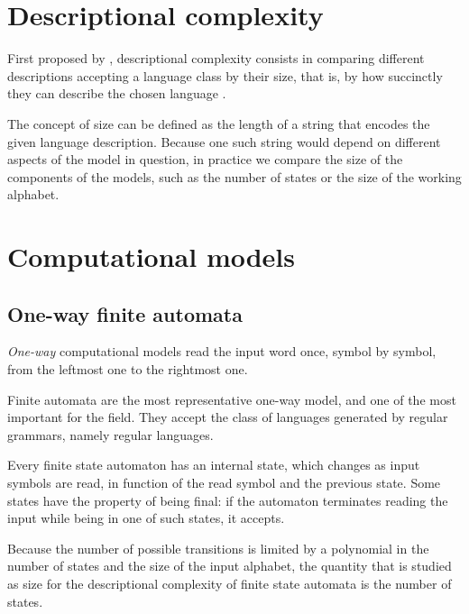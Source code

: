 \section{Descriptional complexity}
First proposed by \citeauthor{MeyFis71}, descriptional complexity consists in comparing different descriptions accepting a language class by their size, that is, by how succinctly they can describe the chosen language \cite{MeyFis71}.

The concept of size can be defined as the length of a string that encodes the given language description.
Because one such string would depend on different aspects of the model in question, in practice we compare the size of the components of the models, such as the number of states or the size of the working alphabet.



\section{Computational models}


\subsection{One-way finite automata}
\emph{One-way} computational models read the input word once, symbol by symbol, from the leftmost one to the rightmost one.

Finite automata are the most representative one-way model, and one of the most important for the field.
They accept the class of languages generated by regular grammars, namely regular languages.

Every finite state automaton has an internal state, which changes as input symbols are read, in function of the read symbol and the previous state.
Some states have the property of being final: if the automaton terminates reading the input while being in one of such states, it accepts.

Because the number of possible transitions is limited by a polynomial in the number of states and the size of the input alphabet, the quantity that is studied as size for the descriptional complexity of finite state automata is the number of states.

